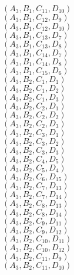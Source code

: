 \documentclass[14pt]{article}
\begin{document}
    $({A}_{3}, {B}_{1}, {C}_{11}, {D}_{10}) $ \\ 
    $({A}_{3}, {B}_{1}, {C}_{12}, {D}_{9}) $ \\ 
    $({A}_{3}, {B}_{1}, {C}_{12}, {D}_{10}) $ \\ 
    $({A}_{3}, {B}_{1}, {C}_{13}, {D}_{7}) $ \\ 
    $({A}_{3}, {B}_{1}, {C}_{13}, {D}_{8}) $ \\ 
    $({A}_{3}, {B}_{1}, {C}_{14}, {D}_{7}) $ \\ 
    $({A}_{3}, {B}_{1}, {C}_{14}, {D}_{8}) $ \\ 
    $({A}_{3}, {B}_{1}, {C}_{15}, {D}_{6}) $ \\ 
    $({A}_{3}, {B}_{2}, {C}_{1}, {D}_{1}) $ \\ 
    $({A}_{3}, {B}_{2}, {C}_{1}, {D}_{2}) $ \\ 
    $({A}_{3}, {B}_{2}, {C}_{1}, {D}_{3}) $ \\ 
    $({A}_{3}, {B}_{2}, {C}_{2}, {D}_{1}) $ \\ 
    $({A}_{3}, {B}_{2}, {C}_{2}, {D}_{2}) $ \\ 
    $({A}_{3}, {B}_{2}, {C}_{2}, {D}_{3}) $ \\ 
    $({A}_{3}, {B}_{2}, {C}_{3}, {D}_{1}) $ \\ 
    $({A}_{3}, {B}_{2}, {C}_{3}, {D}_{2}) $ \\ 
    $({A}_{3}, {B}_{2}, {C}_{3}, {D}_{3}) $ \\ 
    $({A}_{3}, {B}_{2}, {C}_{4}, {D}_{5}) $ \\ 
    $({A}_{3}, {B}_{2}, {C}_{5}, {D}_{4}) $ \\ 
    $({A}_{3}, {B}_{2}, {C}_{6}, {D}_{15}) $ \\ 
    $({A}_{3}, {B}_{2}, {C}_{7}, {D}_{13}) $ \\ 
    $({A}_{3}, {B}_{2}, {C}_{7}, {D}_{14}) $ \\ 
    $({A}_{3}, {B}_{2}, {C}_{8}, {D}_{13}) $ \\ 
    $({A}_{3}, {B}_{2}, {C}_{8}, {D}_{14}) $ \\ 
    $({A}_{3}, {B}_{2}, {C}_{9}, {D}_{11}) $ \\ 
    $({A}_{3}, {B}_{2}, {C}_{9}, {D}_{12}) $ \\ 
    $({A}_{3}, {B}_{2}, {C}_{10}, {D}_{11}) $ \\ 
    $({A}_{3}, {B}_{2}, {C}_{10}, {D}_{12}) $ \\ 
    $({A}_{3}, {B}_{2}, {C}_{11}, {D}_{9}) $ \\ 
    $({A}_{3}, {B}_{2}, {C}_{11}, {D}_{10}) $ \\ 
\end{document}
